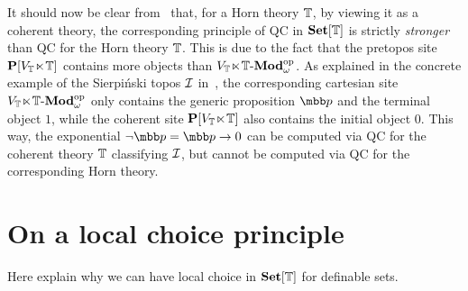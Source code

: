 \begin{remark}
  It should now be clear from~ that, for a Horn theory $\mathbb{T}$, by viewing it as a coherent theory, the corresponding principle of \gls{QC} in $\mathbf{Set}[\mathbb{T}]$ is strictly \emph{stronger} than \gls{QC} for the Horn theory $\mathbb{T}$. This is due to the fact that the pretopos site $\mathbf{P}[V_{\mathbb{T}}\hspace{-.4ex}\ltimes\hspace{-.4ex}\mathbb{T}]$ contains more objects than $V_{\mathbb{T}}\hspace{-.4ex}\ltimes\hspace{-.4ex}\mathbb{T}\text{-}\mathbf{Mod}_\omega^{\mathrm{op}}$. As explained in the concrete example of the Sierpi\'nski topos $\mathcal{I}$ in~, the corresponding cartesian site $V_{\mathbb{T}}\hspace{-.4ex}\ltimes\hspace{-.4ex}\mathbb{T}\text{-}\mathbf{Mod}_\omega^{\mathrm{op}}$ only contains the generic proposition $\mbb p$ and the terminal object $1$, while the coherent site $\mathbf{P}[V_{\mathbb{T}}\hspace{-.4ex}\ltimes\hspace{-.4ex}\mathbb{T}]$ also contains the initial object $0$. This way, the exponential $\neg\mbb p = \mbb p \to 0$ can be computed via \gls{QC} for the coherent theory $\mathbb{T}$ classifying $\mathcal{I}$, but cannot be computed via \gls{QC} for the corresponding Horn theory.
\end{remark}

\section{On a local choice principle}\label{sec:localchoice}

Here explain why we can have local choice in $\mathbf{Set}[\mathbb{T}]$ for definable sets.